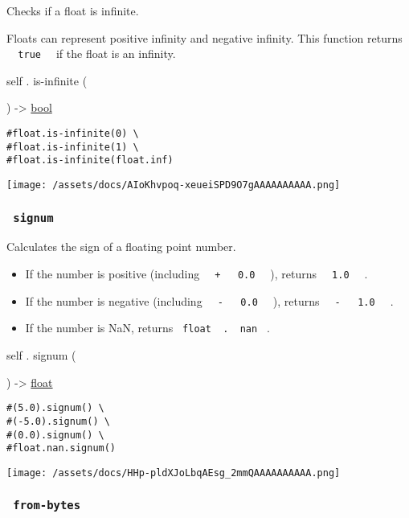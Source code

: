 Checks if a float is infinite.

Floats can represent positive infinity and negative infinity. This
function returns \texttt{\ }{\texttt{\ true\ }}\texttt{\ } if the float
is an infinity.

self { . } { is-infinite } (

) -\textgreater{} \href{/docs/reference/foundations/bool/}{bool}

\begin{verbatim}
#float.is-infinite(0) \
#float.is-infinite(1) \
#float.is-infinite(float.inf)
\end{verbatim}

\texttt{[image: /assets/docs/AIoKhvpoq-xeueiSPD9O7gAAAAAAAAAA.png]}

\subsubsection{\texorpdfstring{\texttt{\ signum\ }}{ signum }}\label{definitions-signum}

Calculates the sign of a floating point number.

\begin{itemize}
\tightlist
\item
  If the number is positive (including
  \texttt{\ }{\texttt{\ +\ }}\texttt{\ }{\texttt{\ 0.0\ }}\texttt{\ } ),
  returns \texttt{\ }{\texttt{\ 1.0\ }}\texttt{\ } .
\item
  If the number is negative (including
  \texttt{\ }{\texttt{\ -\ }}\texttt{\ }{\texttt{\ 0.0\ }}\texttt{\ } ),
  returns
  \texttt{\ }{\texttt{\ -\ }}\texttt{\ }{\texttt{\ 1.0\ }}\texttt{\ } .
\item
  If the number is NaN, returns
  \texttt{\ float\ }{\texttt{\ .\ }}\texttt{\ nan\ } .
\end{itemize}

self { . } { signum } (

) -\textgreater{} \href{/docs/reference/foundations/float/}{float}

\begin{verbatim}
#(5.0).signum() \
#(-5.0).signum() \
#(0.0).signum() \
#float.nan.signum()
\end{verbatim}

\texttt{[image: /assets/docs/HHp-pldXJoLbqAEsg\_2mmQAAAAAAAAAA.png]}

\subsubsection{\texorpdfstring{\texttt{\ from-bytes\ }}{ from-bytes }}\label{definitions-from-bytes}

